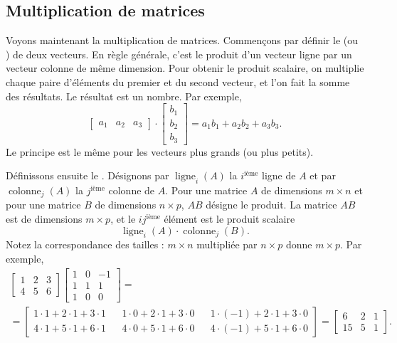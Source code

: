 \subsection{Multiplication de matrices}

Voyons maintenant la multiplication de matrices. Commençons par définir le
\emph{} (ou \emph{}) de deux vecteurs. En règle générale, c'est le produit d'un vecteur ligne par un vecteur colonne de même dimension. Pour obtenir le produit scalaire, on multiplie chaque paire d'éléments du premier et du second vecteur, et l'on fait la somme des résultats. Le résultat est un nombre. Par exemple,
\begin{equation*}
\begin{bmatrix}
a_1 & a_2 & a_3
\end{bmatrix}
\cdot
\begin{bmatrix}
b_1 \\
b_2 \\
b_3
\end{bmatrix}
= a_1 b_1 + a_2 b_2 + a_3 b_3 .
\end{equation*}
Le principe est le même pour les vecteurs plus grands (ou plus petits).

Définissons ensuite le \emph{}. Désignons par $\operatorname{ligne}_i(A)$ la $i^{\text{ième}}$ ligne
de $A$ et par
$\operatorname{colonne}_j(A)$ la $j^{\text{ième}}$ colonne de $A$.
Pour une matrice $A$ de dimensions $m \times n$ et pour une matrice $B$ de dimensions $n \times p$,
$AB$ désigne le produit. La matrice $AB$ est de dimensions $m \times p$,
et le $ij^{\text{ième}}$ élément est le produit scalaire
\begin{equation*}
\operatorname{ligne}_i(A) \cdot
\operatorname{colonne}_j(B) .
\end{equation*}
Notez la correspondance des tailles : $m \times n$ multipliée par $n \times p$ donne 
$m \times p$. Par exemple,
\begin{multline*}
\begin{bmatrix}
1 & 2 & 3 \\
4 & 5 & 6
\end{bmatrix}
\begin{bmatrix}
1 & 0 & -1 \\
1 & 1 & 1 \\
1 & 0 & 0
\end{bmatrix}
= \\ =
\begin{bmatrix}
1\cdot 1 + 2\cdot 1 + 3 \cdot 1 & &
1\cdot 0 + 2\cdot 1 + 3 \cdot 0 & &
1\cdot (-1) + 2\cdot 1 + 3 \cdot 0 \\
4\cdot 1 + 5\cdot 1 + 6 \cdot 1 & &
4\cdot 0 + 5\cdot 1 + 6 \cdot 0 & &
4\cdot (-1) + 5\cdot 1 + 6 \cdot 0
\end{bmatrix}
=
\begin{bmatrix}
6 & 2 & 1 \\
15 & 5 & 1
\end{bmatrix}.
\end{multline*}

